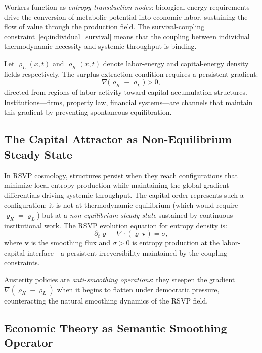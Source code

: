 \documentclass[12pt,a4paper]{article}
\theoremstyle{definition}
\theoremstyle{remark}
\begin{document}
Workers function as \emph{entropy transduction nodes}: biological energy requirements drive the conversion of metabolic potential into economic labor, sustaining the flow of value through the production field. The survival-coupling constraint~\eqref{eq:individual_survival} means that the coupling between individual thermodynamic necessity and systemic throughput is binding.

Let $\varrho_L(x,t)$ and $\varrho_K(x,t)$ denote labor-energy and capital-energy density fields respectively. The surplus extraction condition requires a persistent gradient:
\begin{equation}
  \nabla\!\bigl(\varrho_K - \varrho_L\bigr) > 0,
\end{equation}
directed from regions of labor activity toward capital accumulation structures. Institutions---firms, property law, financial systems---are channels that maintain this gradient by preventing spontaneous equilibration.

\subsection{The Capital Attractor as Non-Equilibrium Steady State}

In RSVP cosmology, structures persist when they reach configurations that minimize local entropy production while maintaining the global gradient differentials driving systemic throughput. The capital order represents such a configuration: it is not at thermodynamic equilibrium (which would require $\varrho_K = \varrho_L$) but at a \emph{non-equilibrium steady state} sustained by continuous institutional work. The RSVP evolution equation for entropy density is:
\begin{equation}
  \label{eq:rsvp_evolution}
  \partial_t \varrho + \nabla \cdot (\varrho\, \mathbf{v}) = \sigma,
\end{equation}
where $\mathbf{v}$ is the smoothing flux and $\sigma > 0$ is entropy production at the labor-capital interface---a persistent irreversibility maintained by the coupling constraints.

Austerity policies are \emph{anti-smoothing operations}: they steepen the gradient $\nabla(\varrho_K - \varrho_L)$ when it begins to flatten under democratic pressure, counteracting the natural smoothing dynamics of the RSVP field.

\subsection{Economic Theory as Semantic Smoothing Operator}
\end{document}
